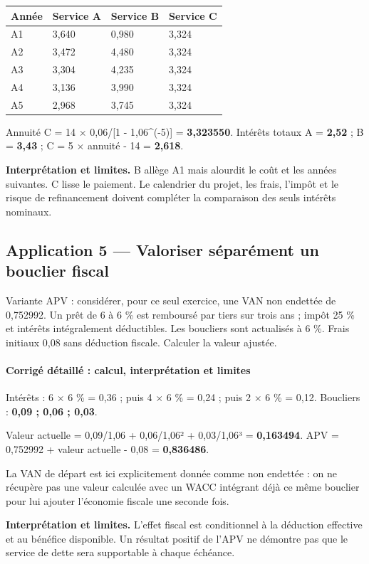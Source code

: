 \documentclass[12pt,a4paper]{article}
\begin{document}
\Needspace{250pt}
\begin{longtable}{p{3.67cm}p{3.67cm}p{3.67cm}p{3.67cm}}
\toprule
Année & Service A & Service B & Service C \\
\midrule\endhead
A1 & 3,640 & 0,980 & 3,324 \\
A2 & 3,472 & 4,480 & 3,324 \\
A3 & 3,304 & 4,235 & 3,324 \\
A4 & 3,136 & 3,990 & 3,324 \\
A5 & 2,968 & 3,745 & 3,324 \\
\bottomrule
\end{longtable}
Annuité C = 14 $\times$ 0,06/[1 - 1,06\textasciicircum{}(-5)] = \textbf{3,323550}. Intérêts totaux A = \textbf{2,52} ; B = \textbf{3,43} ; C = 5 $\times$ annuité - 14 = \textbf{2,618}.

\textbf{Interprétation et limites.} B allège A1 mais alourdit le coût et les années suivantes. C lisse le paiement. Le calendrier du projet, les frais, l’impôt et le risque de refinancement doivent compléter la comparaison des seuls intérêts nominaux.


\subsection*{Application 5 --- Valoriser séparément un bouclier fiscal}
Variante APV : considérer, pour ce seul exercice, une VAN non endettée de 0,752992. Un prêt de 6 à 6 \% est remboursé par tiers sur trois ans ; impôt 25 \% et intérêts intégralement déductibles. Les boucliers sont actualisés à 6 \%. Frais initiaux 0,08 sans déduction fiscale. Calculer la valeur ajustée.


\paragraph{Corrigé détaillé : calcul, interprétation et limites}
Intérêts : 6 $\times$ 6 \% = 0,36 ; puis 4 $\times$ 6 \% = 0,24 ; puis 2 $\times$ 6 \% = 0,12. Boucliers : \textbf{0,09 ; 0,06 ; 0,03}.

Valeur actuelle = 0,09/1,06 + 0,06/1,06² + 0,03/1,06³ = \textbf{0,163494}. APV = 0,752992 + valeur actuelle - 0,08 = \textbf{0,836486}.

La VAN de départ est ici explicitement donnée comme non endettée : on ne récupère pas une valeur calculée avec un WACC intégrant déjà ce même bouclier pour lui ajouter l’économie fiscale une seconde fois.

\textbf{Interprétation et limites.} L’effet fiscal est conditionnel à la déduction effective et au bénéfice disponible. Un résultat positif de l’APV ne démontre pas que le service de dette sera supportable à chaque échéance.
\end{document}
